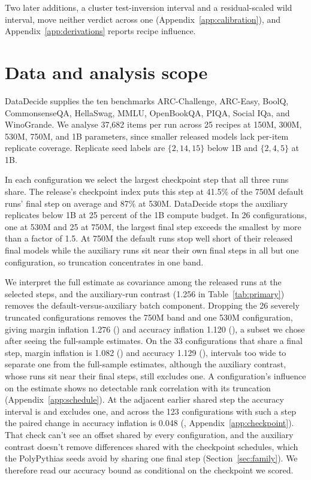 Two later additions, a cluster test-inversion interval and a residual-scaled wild interval, move neither verdict across one (Appendix~\ref{app:calibration}), and Appendix~\ref{app:derivations} reports recipe influence.

\section{Data and analysis scope}
\label{sec:data}
DataDecide supplies the ten benchmarks ARC-Challenge, ARC-Easy, BoolQ, CommonsenseQA, HellaSwag, MMLU, OpenBookQA, PIQA, Social IQa, and WinoGrande. We analyse 37,682 items per run across 25 recipes at 150M, 300M, 530M, 750M, and 1B parameters, since smaller released models lack per-item replicate coverage. Replicate seed labels are $\{2,14,15\}$ below 1B and $\{2,4,5\}$ at 1B.

In each configuration we select the largest checkpoint step that all three runs share. The release's checkpoint index puts this step at 41.5\% of the 750M default runs' final step on average and 87\% at 530M. DataDecide stops the auxiliary replicates below 1B at 25 percent of the 1B compute budget. In 26 configurations, one at 530M and 25 at 750M, the largest final step exceeds the smallest by more than a factor of 1.5. At 750M the default runs stop well short of their released final models while the auxiliary runs sit near their own final steps in all but one configuration, so truncation concentrates in one band.

We interpret the full estimate as covariance among the released runs at the selected steps, and the auxiliary-run contrast (1.256 in Table~\ref{tab:primary}) removes the default-versus-auxiliary batch component. Dropping the 26 severely truncated configurations removes the 750M band and one 530M configuration, giving margin inflation 1.276 () and accuracy inflation 1.120 (), a subset we chose after seeing the full-sample estimates. On the 33 configurations that share a final step, margin inflation is 1.082 () and accuracy 1.129 (), intervals too wide to separate one from the full-sample estimates, although the auxiliary contrast, whose runs sit near their final steps, still excludes one. A configuration's influence on the estimate shows no detectable rank correlation with its truncation (Appendix~\ref{app:schedule}). At the adjacent earlier shared step the accuracy interval is  and excludes one, and across the 123 configurations with such a step the paired change in accuracy inflation is 0.048 (, Appendix~\ref{app:checkpoint}). That check can't see an offset shared by every configuration, and the auxiliary contrast doesn't remove differences shared with the checkpoint schedules, which the PolyPythias seeds avoid by sharing one final step (Section~\ref{sec:family}). We therefore read our accuracy bound as conditional on the checkpoint we scored.

